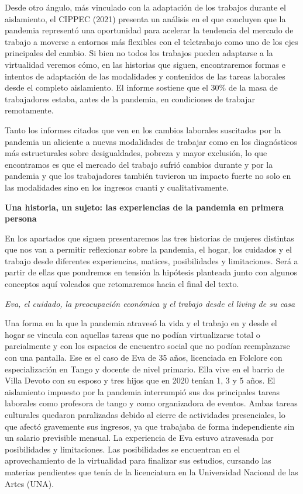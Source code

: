 Desde otro ángulo, más vinculado con la adaptación de los trabajos durante el aislamiento, el CIPPEC (2021) presenta un análisis en el que concluyen que la pandemia representó una oportunidad para acelerar la tendencia del mercado de trabajo a moverse a entornos más flexibles con el teletrabajo como uno de los ejes principales del cambio. Si bien no todos los trabajos pueden adaptarse a la virtualidad veremos cómo, en las historias que siguen, encontraremos formas e intentos de adaptación de las modalidades y contenidos de las tareas laborales desde el completo aislamiento. El informe sostiene que el 30\% de la masa de trabajadores estaba, antes de la pandemia, en condiciones de trabajar remotamente.

Tanto los informes citados que ven en los cambios laborales suscitados por la pandemia un aliciente a nuevas modalidades de trabajar como en los diagnósticos más estructurales sobre desigualdades, pobreza y mayor exclusión, lo que encontramos es que el mercado del trabajo sufrió cambios durante y por la pandemia y que los trabajadores también tuvieron un impacto fuerte no solo en las modalidades sino en los ingresos cuanti y cualitativamente.

\textbf{Una historia, un sujeto: las experiencias de la pandemia en primera persona}

En los apartados que siguen presentaremos las tres historias de mujeres distintas que nos van a permitir reflexionar sobre la pandemia, el hogar, los cuidados y el trabajo desde diferentes experiencias, matices, posibilidades y limitaciones. Será a partir de ellas que pondremos en tensión la hipótesis planteada junto con algunos conceptos aquí volcados que retomaremos hacia el final del texto.

\emph{Eva, el cuidado, la preocupación económica y el trabajo desde el living de su casa}

Una forma en la que la pandemia atravesó la vida y el trabajo en y desde el hogar se vincula con aquellas tareas que no podían virtualizarse total o parcialmente y con los espacios de encuentro social que no podían reemplazarse con una pantalla. Ese es el caso de Eva de 35 años, licenciada en Folclore con especialización en Tango y docente de nivel primario. Ella vive en el barrio de Villa Devoto con su esposo y tres hijos que en 2020 tenían 1, 3 y 5 años. El aislamiento impuesto por la pandemia interrumpió sus dos principales tareas laborales como profesora de tango y como organizadora de eventos. Ambas tareas culturales quedaron paralizadas debido al cierre de actividades presenciales, lo que afectó gravemente sus ingresos, ya que trabajaba de forma independiente sin un salario previsible mensual. La experiencia de Eva estuvo atravesada por posibilidades y limitaciones. Las posibilidades se encuentran en el aprovechamiento de la virtualidad para finalizar sus estudios, cursando las materias pendientes que tenía de la licenciatura en la Universidad Nacional de las Artes (UNA).

